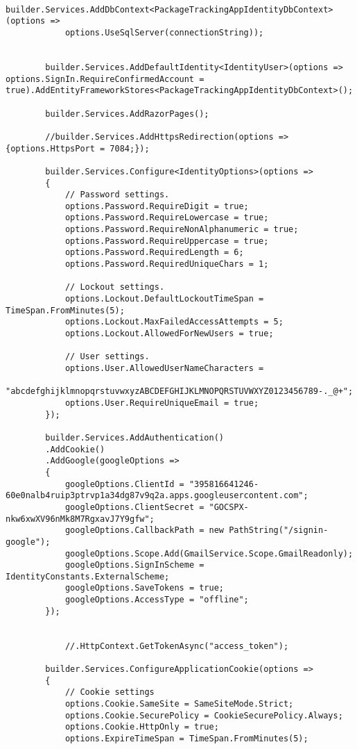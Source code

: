 \begin{verbatim}
        builder.Services.AddDbContext<PackageTrackingAppIdentityDbContext>(options =>
            options.UseSqlServer(connectionString));
        
        
        builder.Services.AddDefaultIdentity<IdentityUser>(options => options.SignIn.RequireConfirmedAccount = true).AddEntityFrameworkStores<PackageTrackingAppIdentityDbContext>();
        
        builder.Services.AddRazorPages();
        
        //builder.Services.AddHttpsRedirection(options => {options.HttpsPort = 7084;});
        
        builder.Services.Configure<IdentityOptions>(options =>
        {
            // Password settings.
            options.Password.RequireDigit = true;
            options.Password.RequireLowercase = true;
            options.Password.RequireNonAlphanumeric = true;
            options.Password.RequireUppercase = true;
            options.Password.RequiredLength = 6;
            options.Password.RequiredUniqueChars = 1;
        
            // Lockout settings.
            options.Lockout.DefaultLockoutTimeSpan = TimeSpan.FromMinutes(5);
            options.Lockout.MaxFailedAccessAttempts = 5;
            options.Lockout.AllowedForNewUsers = true;
        
            // User settings.
            options.User.AllowedUserNameCharacters =
            "abcdefghijklmnopqrstuvwxyzABCDEFGHIJKLMNOPQRSTUVWXYZ0123456789-._@+";
            options.User.RequireUniqueEmail = true;
        });
        
        builder.Services.AddAuthentication()
        .AddCookie()
        .AddGoogle(googleOptions =>
        {
            googleOptions.ClientId = "395816641246-60e0nalb4ruip3ptrvp1a34dg87v9q2a.apps.googleusercontent.com";
            googleOptions.ClientSecret = "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";
            googleOptions.CallbackPath = new PathString("/signin-google");
            googleOptions.Scope.Add(GmailService.Scope.GmailReadonly);
            googleOptions.SignInScheme = IdentityConstants.ExternalScheme;
            googleOptions.SaveTokens = true;
            googleOptions.AccessType = "offline";
        });
        
        
            //.HttpContext.GetTokenAsync("access_token");
        
        builder.Services.ConfigureApplicationCookie(options =>
        {
            // Cookie settings
            options.Cookie.SameSite = SameSiteMode.Strict;
            options.Cookie.SecurePolicy = CookieSecurePolicy.Always;
            options.Cookie.HttpOnly = true;
            options.ExpireTimeSpan = TimeSpan.FromMinutes(5);
        

\end{verbatim}
